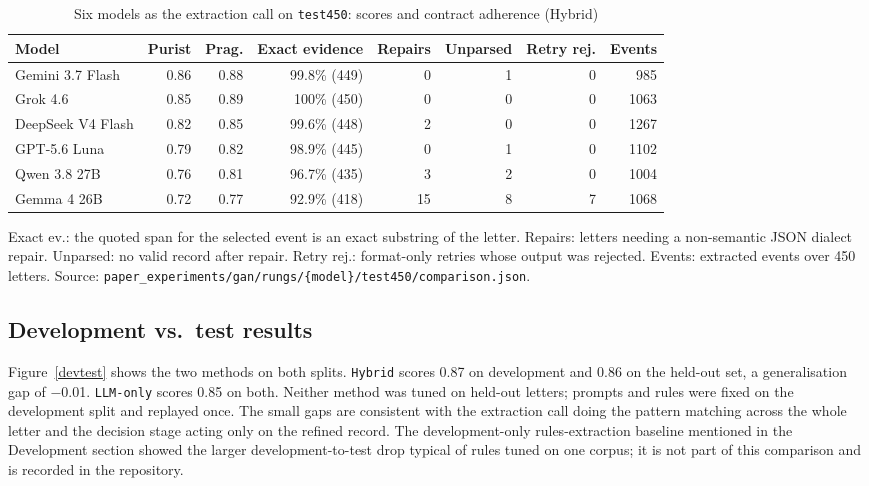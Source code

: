 \documentclass[conference]{IEEEtran}
\begin{document}
\begin{table}[!t]
\caption{Six models as the extraction call on \texttt{test450}: scores and contract adherence (Hybrid)}
\label{tab:adherence-supp}
\centering
\footnotesize
\begin{tabularx}{\textwidth}{Yrrrrrrr}
\toprule
\textbf{Model} & \textbf{Purist} & \textbf{Prag.} & \textbf{Exact evidence} & \textbf{Repairs} & \textbf{Unparsed} & \textbf{Retry rej.} & \textbf{Events} \\
\midrule
Gemini 3.7 Flash & 0.86 & 0.88 & 99.8\% (449) & 0 & 1 & 0 & 985 \\
Grok 4.6 & 0.85 & 0.89 & 100\% (450) & 0 & 0 & 0 & 1063 \\
DeepSeek V4 Flash & 0.82 & 0.85 & 99.6\% (448) & 2 & 0 & 0 & 1267 \\
GPT-5.6 Luna & 0.79 & 0.82 & 98.9\% (445) & 0 & 1 & 0 & 1102 \\
Qwen 3.8 27B & 0.76 & 0.81 & 96.7\% (435) & 3 & 2 & 0 & 1004 \\
Gemma 4 26B & 0.72 & 0.77 & 92.9\% (418) & 15 & 8 & 7 & 1068 \\
\bottomrule
\end{tabularx}

\vspace*{2pt}
\begin{minipage}{\textwidth}
\raggedright\footnotesize
Exact ev.: the quoted span for the selected event is an exact substring of the letter. Repairs: letters needing a non-semantic JSON dialect repair. Unparsed: no valid record after repair. Retry rej.: format-only retries whose output was rejected. Events: extracted events over 450 letters. Source: \texttt{paper\_experiments/gan/rungs/\{model\}/test450/comparison.json}.
\end{minipage}
\end{table}

\subsection{Development vs.\ test results}

Figure~\ref{devtest} shows the two methods on 
both splits. \texttt{Hybrid} scores 0.87 on 
development and 0.86 on the held-out set, a 
generalisation gap of $-$0.01. \texttt{LLM-only} scores 0.85 
on both. Neither method was tuned on 
held-out letters; prompts and rules were fixed on the 
development split and replayed once. The small gaps are 
consistent with the extraction call doing the pattern 
matching across the whole letter and the decision stage 
acting only on the refined record. The development-only 
rules-extraction baseline mentioned in the Development 
section showed the larger development-to-test drop typical of 
rules tuned on one corpus; it is not part of this comparison 
and is recorded in the repository.
\end{document}
